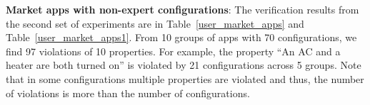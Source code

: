 \textbf{Market apps with non-expert configurations}:
The verification results from the second set of experiments are in Table~\ref{user_market_apps} and Table~\ref{user_market_apps1}.
From 10 groups of apps with 70 configurations,
we find 97 violations of 10 properties.
For example, the property ``An AC and a heater are both turned on'' is violated by 21 configurations across 5 groups.
Note that in some configurations multiple properties are violated
and thus, the number of violations is more than the number of configurations.
